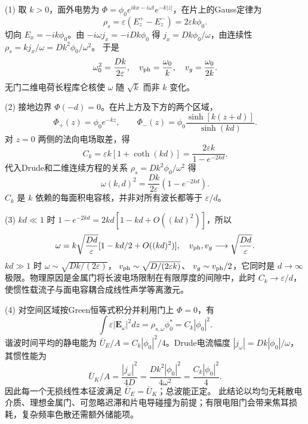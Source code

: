 (1) 取 \(k>0\)，面外电势为 \(\Phi=\phi_0 e^{ikx-i\omega t}e^{-k|z|}\)，在片上的Gauss定律为
\[
\rho_s=\varepsilon(E_z^+-E_z^-)=2\varepsilon k\phi_0.
\]
切向 \(E_x=-ik\phi_0\)。由 \(-i\omega j_x=-iDk\phi_0\) 得
\(j_x=Dk\phi_0/\omega\)，由连续性
\(\rho_s=kj_x/\omega=Dk^2\phi_0/\omega^2\)。
于是
\[
\omega_0^2=\frac{Dk}{2\varepsilon},\quad
v_{\rm ph}=\frac{\omega_0}k,\quad
v_g=\frac{\omega_0}{2k}.
\]
无门二维电荷长程库仑核使 \(\omega\) 随 \(\sqrt{k}\) 而非 \(k\) 变化。

(2) 接地边界 \(\Phi(-d)=0\)。在片上方及下方的两个区域，
\[
\Phi_+(z)=\phi_0e^{-kz},\qquad
\Phi_-(z)=\phi_0\frac{\sinh[k(z+d)]}{\sinh(kd)}.
\]
对 \(z=0\) 两侧的法向电场取差，得
\[
C_k=\varepsilon k[1+\coth(kd)]
=\frac{2\varepsilon k}{1-e^{-2kd}}.
\]
代入Drude和二维连续方程的关系
\(\rho_s=Dk^2\phi_0/\omega^2\) 得
\[
\boxed{\omega(k,d)^2=\frac{Dk}{2\varepsilon}(1-e^{-2kd})}.
\]
\(C_k\) 是 \(k\) 依赖的每面积电容核，并非对所有波长都等于 \(\varepsilon/d\)。

(3) \(kd\ll1\) 时
\(1-e^{-2kd}=2kd[1-kd+O((kd)^2)]\)，所以
\[
\omega=k\sqrt{\frac{Dd}{\varepsilon}}
[1-kd/2+O((kd)^2)],\quad
v_{\rm ph},v_g\longrightarrow\sqrt{\frac{Dd}{\varepsilon}}.
\]
\(kd\gg1\) 时 \(\omega\sim\sqrt{Dk/(2\varepsilon)}\)，
\(v_{\rm ph}\sim\sqrt{D/(2\varepsilon k)}\)、
\(v_g\sim v_{\rm ph}/2\)，它同时是 \(d\to\infty\) 极限。物理原因是金属门将长波电场限制在有限厚度的间隙中，此时 \(C_k\to\varepsilon/d\)，使惯性载流子与面电容耦合成线性声学等离激元。

(4) 对空间区域按Green恒等式积分并利用门上 \(\Phi=0\)，有
\[
\int \varepsilon|\mathbf E_\omega|^2 dz
=\rho_{s,\omega}\phi_0^*=C_k|\phi_0|^2.
\]
谐波时间平均的静电能为
\(\bar U_E/A=C_k|\phi_0|^2/4\)。Drude电流幅度
\(|j_\omega|=Dk|\phi_0|/\omega\)，其惯性能为
\[
\bar U_K/A=\frac{|j_\omega|^2}{4D}
=\frac{Dk^2|\phi_0|^2}{4\omega^2}
=\frac{C_k|\phi_0|^2}{4}.
\]
因此每一个无损线性本征波满足 \(\bar U_E=\bar U_K\)；总波能正定。
此结论以均匀无耗散电介质、理想金属门、可忽略迟滞和片电导碰撞为前提；有限电阻门会带来焦耳损耗，复杂频率色散还需额外储能项。
